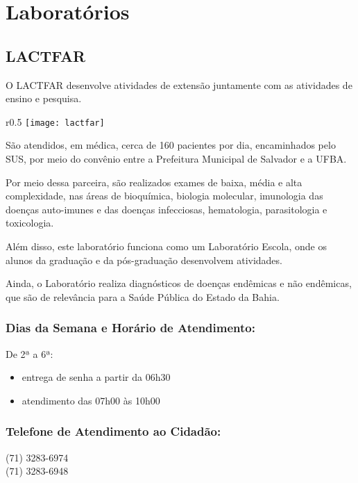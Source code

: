 \section{Laboratórios}
    \subsection{LACTFAR}
    
    O LACTFAR desenvolve atividades de extensão juntamente com as atividades de ensino e pesquisa.
    
    \begin{wrapfigure}{r}{0.5\textwidth}
        \centering \texttt{[image: lactfar]}
    \end{wrapfigure}

    São atendidos, em médica, cerca de 160 pacientes por dia, encaminhados pelo SUS, por meio do convênio entre a Prefeitura Municipal de Salvador e a UFBA.
    
    Por meio dessa parceira, são realizados exames de baixa, média e alta complexidade, nas áreas de bioquímica, biologia molecular, imunologia das doenças auto-imunes e das doenças infecciosas, hematologia, parasitologia e toxicologia. 
    
    Além disso, este laboratório funciona como um Laboratório Escola, onde os alunos da graduação e da pós-graduação desenvolvem atividades.
    
    Ainda, o Laboratório realiza diagnósticos de doenças endêmicas e não endêmicas, que são de relevância para a Saúde Pública do Estado da Bahia.

    
    \subsubsection {Dias da Semana e Horário de Atendimento:}
        De 2ª a 6ª: 
        \begin{itemize}
            \item entrega de senha a partir da 06h30
            \item atendimento das 07h00 às 10h00
        \end{itemize}
 
    \subsubsection {Telefone de Atendimento ao Cidadão:}
        (71) 3283-6974 \\
        (71) 3283-6948
        
